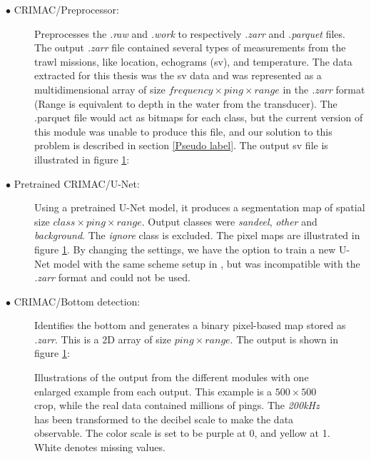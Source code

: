             \begin{description}
              \item[$\bullet$ CRIMAC/Preprocessor:] Preprocesses the \textit{.raw} and \textit{.work} to respectively \textit{.zarr} and \textit{.parquet} files. The output \textit{.zarr} file contained several types of measurements from the trawl missions, like location, echograms (\gls{sv}), and temperature. The data extracted for this thesis was the \gls{sv} data and was represented as a multidimensional array of size $frequency \times ping \times range$ in the  \textit{.zarr} format (Range is equivalent to depth in the water from the transducer).  The .parquet file would act as bitmaps for each class, but the current version of this module was unable to produce this file, and our solution to this problem is described in section \ref{Pseudo label}. The output \gls{sv} file is illustrated in figure \ref{Module_outputs_illustration_fig}:
                
              \item[$\bullet$ Pretrained CRIMAC/U-Net:] Using a pretrained U-Net model, it produces a segmentation map of spatial size $class \times ping \times range$. Output classes were \textit{sandeel}, \textit{other} and \textit{background}. The \textit{ignore} class is excluded. The pixel maps are illustrated in figure \ref{Module_outputs_illustration_fig}. By changing the settings, we have the option to train a new U-Net model with the same scheme setup in \citeauthor{brautaset2020acoustic}, but was incompatible with the \textit{.zarr} format and could not be used.
              
              \item[$\bullet$ CRIMAC/Bottom detection:] Identifies the bottom and generates a binary pixel-based map stored as \textit{.zarr}. This is a 2D array of size $ping \times range$. The output is shown in figure \ref{Module_outputs_illustration_fig}:

            \end{description}
            
        
        \begin{figure}[H]
            \centering
            
            \caption[Module outputs illustration]{Illustrations of the output from the different modules with one enlarged example from each output. This example is a $500\times500$ crop, while the real data contained millions of pings. The \textit{200kHz} has been transformed to the decibel scale to make the data observable. The color scale is set to be purple at 0, and yellow at 1. White denotes missing values.}
          	\medskip 
            \label{Module_outputs_illustration_fig}
        \end{figure}

